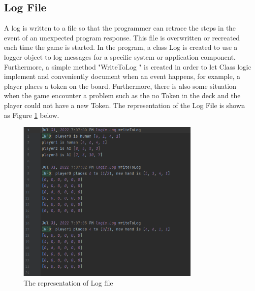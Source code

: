 \subsection{Log File}

A log is written to a file so that the programmer can retrace the steps in the event of an unexpected program response. This file is overwritten or recreated each time the game is started. In the program, a class Log is created to use a logger object to log messages for a specific system or application component. Furthermore, a simple method "WriteToLog " is created in order to let Class logic implement and conveniently document when an event happens, for example, a player places a token on the board. Furthermore, there is also some situation when the game encounter a problem such as the no Token in the deck and the player could not have a new Token. The representation of the Log File is shown as Figure \ref{fig: logFile} below.

\begin{figure}[h]
	\centering
	\includegraphics[width=0.8\textwidth]{image/logFile}
	\caption{The representation of Log file}
	\label{fig: logFile}
\end{figure}


